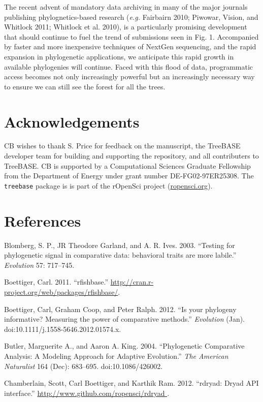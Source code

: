 \documentclass[author-year, 8pt, 3p]{elsarticle} %
\begin{document}
The recent advent of mandatory data archiving in many of the major
journals publishing phylognetics-based research (\emph{e.g.} Fairbairn
2010; Piwowar, Vision, and Whitlock 2011; Whitlock et al. 2010), is a
particularly promising development that should continue to fuel the
trend of submissions seen in Fig. 1. Accompanied by faster and more
inexpensive techniques of NextGen sequencing, and the rapid expansion in
phylogenetic applications, we anticipate this rapid growth in available
phylogenies will continue. Faced with this flood of data, programmatic
access becomes not only increasingly powerful but an increasingly
necessary way to ensure we can still see the forest for all the trees.

\section{Acknowledgements}

CB wishes to thank S. Price for feedback on the manuscript, the TreeBASE
developer team for building and supporting the repository, and all
contributers to TreeBASE. CB is supported by a Computational Sciences
Graduate Fellowship from the Department of Energy under grant number
DE-FG02-97ER25308. The \texttt{treebase} package is is part of the
rOpenSci project (\href{http://ropensci.org}{ropensci.org}).

\section{References}

Blomberg, S. P., JR Theodore Garland, and A. R. Ives. 2003. ``Testing
for phylogenetic signal in comparative data: behavioral traits are more
labile.'' \emph{Evolution} 57: 717--745.

Boettiger, Carl. 2011. ``rfishbase.''
\href{http://cran.r-project.org/web/packages/rfishbase/}{http://cran.r-project.org/web/packages/rfishbase/}.

Boettiger, Carl, Graham Coop, and Peter Ralph. 2012. ``Is your phylogeny
informative? Measuring the power of comparative methods.''
\emph{Evolution} (Jan). doi:10.1111/j.1558-5646.2012.01574.x.

Butler, Marguerite A., and Aaron A. King. 2004. ``Phylogenetic
Comparative Analysis: A Modeling Approach for Adaptive Evolution.''
\emph{The American Naturalist} 164 (Dec): 683--695. doi:10.1086/426002.

Chamberlain, Scott, Carl Boettiger, and Karthik Ram. 2012. ``rdryad:
Dryad API interface.''
\href{http://www.github.com/ropensci/rdryad }{http://www.github.com/ropensci/rdryad
}.
\end{document}
